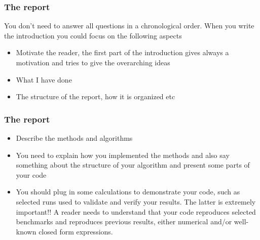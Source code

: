 \documentclass{beamer}
\newenvironment{block_mdfboxadmon}[1][]{\begin{block}{#1}}{\end{block}}
\begin{document}
\begin{frame}
\frametitle{The report}

\begin{block_mdfboxadmon}
You don't need to answer all questions in a chronological order.  When you write the introduction you could focus on the following aspects
\begin{itemize}
 \item Motivate the reader, the first part of the introduction gives always a motivation and tries to give the overarching ideas

 \item What I have done

 \item The structure of the report, how it is organized etc
\end{itemize}

\noindent
\end{block_mdfboxadmon}
\end{frame}

\begin{frame}
\frametitle{The report}

\begin{block_mdfboxadmon}
\begin{itemize}
 \item Describe the methods and algorithms

 \item You need to explain how you implemented the methods and also say something about the structure of your algorithm and present some parts of your code

 \item You should plug in some calculations to demonstrate your code, such as selected runs used to validate and verify your results. The latter is extremely important!!  A reader needs to understand that your code reproduces selected benchmarks and reproduces previous results, either numerical and/or well-known  closed form expressions.
\end{itemize}

\noindent
\end{block_mdfboxadmon}
\end{frame}
\end{document}
